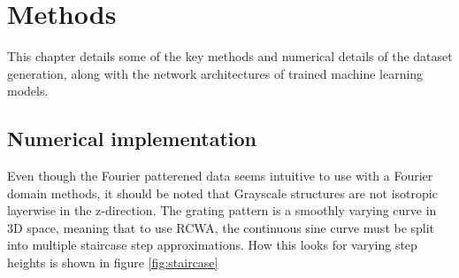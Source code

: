 \chapter{Methods}
This chapter details some of the key methods and numerical details of the dataset generation, along with the network architectures of trained machine learning models.
\label{sec:methods}
\section{Numerical implementation}
Even though the Fourier patterened data seems intuitive to use with a Fourier domain methods, it should be noted that Grayscale structures are not isotropic layerwise in the z-direction.
The grating pattern is a smoothly varying curve in 3D space, meaning that to use RCWA, the continuous sine curve must be split into multiple staircase step approximations. How this looks for varying step heights is shown in figure \ref{fig:staircase}

